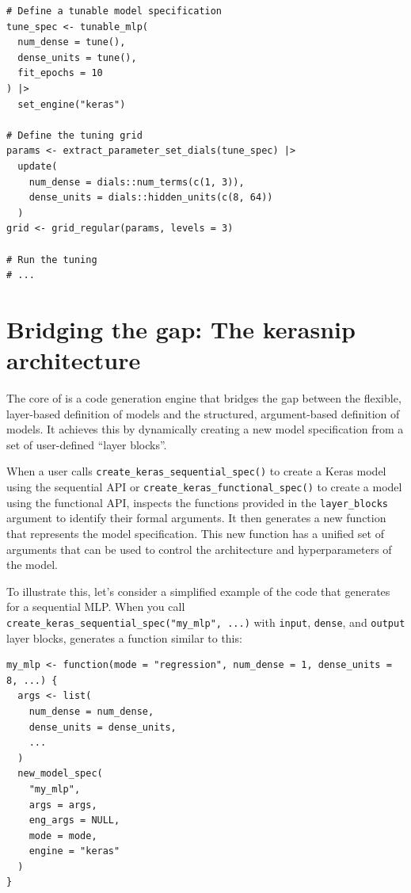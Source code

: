 \begin{verbatim}
# Define a tunable model specification
tune_spec <- tunable_mlp(
  num_dense = tune(),
  dense_units = tune(),
  fit_epochs = 10
) |>
  set_engine("keras")

# Define the tuning grid
params <- extract_parameter_set_dials(tune_spec) |>
  update(
    num_dense = dials::num_terms(c(1, 3)),
    dense_units = dials::hidden_units(c(8, 64))
  )
grid <- grid_regular(params, levels = 3)

# Run the tuning
# ...
\end{verbatim}

\section{Bridging the gap: The kerasnip architecture}\label{bridging-the-gap-the-kerasnip-architecture}

The core of  is a code generation engine that bridges the gap between the flexible, layer-based definition of  models and the structured, argument-based definition of  models. It achieves this by dynamically creating a new  model specification from a set of user-defined ``layer blocks''.

When a user calls \texttt{create\_keras\_sequential\_spec()} to create a Keras model using the sequential API or \texttt{create\_keras\_functional\_spec()} to create a model using the functional API,  inspects the functions provided in the \texttt{layer\_blocks} argument to identify their formal arguments. It then generates a new function that represents the  model specification. This new function has a unified set of arguments that can be used to control the architecture and hyperparameters of the  model.

To illustrate this, let's consider a simplified example of the code that  generates for a sequential MLP. When you call \texttt{create\_keras\_sequential\_spec("my\_mlp",\ ...)} with \texttt{input}, \texttt{dense}, and \texttt{output} layer blocks,  generates a function similar to this:

\begin{verbatim}
my_mlp <- function(mode = "regression", num_dense = 1, dense_units = 8, ...) {
  args <- list(
    num_dense = num_dense,
    dense_units = dense_units,
    ...
  )
  new_model_spec(
    "my_mlp",
    args = args,
    eng_args = NULL,
    mode = mode,
    engine = "keras"
  )
}
\end{verbatim}

